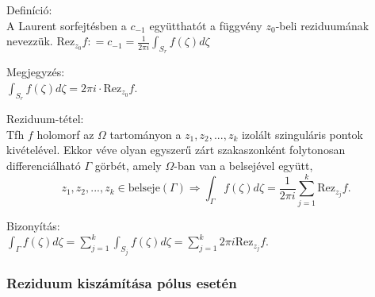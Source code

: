 \documentclass[12pt,a4paper]{scrartcl}
\newenvironment{definicio}{}{}
\newenvironment{tetel}{}{}
\newenvironment{bizonyitas}{}{}
\newenvironment{megjegyzes}{}{}
\begin{document}
\begin{definicio}

Definíció:\\
A Laurent sorfejtésben a \(c_{- 1}\) együtthatót a függvény
\(z_{0}\)-beli reziduumának nevezzük.
\(\text{Rez}_{z_{0}}f: = c_{- 1} = \frac{1}{2\pi i}{\int_{S_{r}}{f\left( \zeta \right)d\zeta}}\)

\end{definicio}

\begin{megjegyzes}

Megjegyzés:\\
\({\int_{S_{r}}{f\left( \zeta \right)d\zeta}} = 2\pi i \cdot \text{Rez}_{z_{0}}f\).

\end{megjegyzes}

\begin{tetel}

Reziduum-tétel:\\
Tfh \(f\) holomorf az \(\Omega\) tartományon a \(z_{1},z_{2},...,z_{k}\)
izolált szinguláris pontok kivételével. Ekkor véve olyan egyszerű zárt
szakaszonként folytonosan differenciálható \(\Gamma\) görbét, amely
\(\Omega\)-ban van a belsejével együtt,
\[\left. z_{1},z_{2},...,z_{k} \in \text{belseje}\left( \Gamma \right)\Rightarrow{\int_{\Gamma}{f\left( \zeta \right)d\zeta}} = \frac{1}{2\pi i}\sum\limits_{j = 1}^{k}\text{Rez}_{z_{j}}f. \right.\]

\end{tetel}

\begin{bizonyitas}

Bizonyítás:\\
\({\int_{\Gamma}{f\left( \zeta \right)d\zeta}} = \sum\limits_{j = 1}^{k}{\int_{S_{j}}{f\left( \zeta \right)d\zeta}} = \sum\limits_{j = 1}^{k}2\pi i\text{Rez}_{z_{j}}f\).

\end{bizonyitas}

\hypertarget{reziduum-kiszamitasa-polus-eseten}{%
\subsubsection{Reziduum kiszámítása pólus
esetén}\label{reziduum-kiszamitasa-polus-eseten}}
\end{document}
